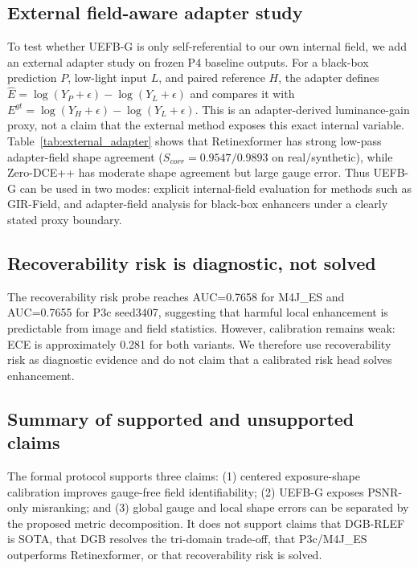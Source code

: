 \subsection{External field-aware adapter study}

To test whether UEFB-G is only self-referential to our own internal field, we add an external adapter study on frozen P4 baseline outputs. For a black-box prediction $P$, low-light input $L$, and paired reference $H$, the adapter defines $\hat{E}=\log(Y_P+\epsilon)-\log(Y_L+\epsilon)$ and compares it with $E^{gt}=\log(Y_H+\epsilon)-\log(Y_L+\epsilon)$. This is an adapter-derived luminance-gain proxy, not a claim that the external method exposes this exact internal variable. Table~\ref{tab:external_adapter} shows that Retinexformer has strong low-pass adapter-field shape agreement ($S_{corr}=0.9547/0.9893$ on real/synthetic), while Zero-DCE++ has moderate shape agreement but large gauge error. Thus UEFB-G can be used in two modes: explicit internal-field evaluation for methods such as GIR-Field, and adapter-field analysis for black-box enhancers under a clearly stated proxy boundary.



\subsection{Recoverability risk is diagnostic, not solved}

The recoverability risk probe reaches AUC=0.7658 for M4J\_ES and AUC=0.7655 for P3c seed3407, suggesting that harmful local enhancement is predictable from image and field statistics. However, calibration remains weak: ECE is approximately 0.281 for both variants. We therefore use recoverability risk as diagnostic evidence and do not claim that a calibrated risk head solves enhancement.

\subsection{Summary of supported and unsupported claims}

The formal protocol supports three claims: (1) centered exposure-shape calibration improves gauge-free field identifiability; (2) UEFB-G exposes PSNR-only misranking; and (3) global gauge and local shape errors can be separated by the proposed metric decomposition. It does not support claims that DGB-RLEF is SOTA, that DGB resolves the tri-domain trade-off, that P3c/M4J\_ES outperforms Retinexformer, or that recoverability risk is solved.
